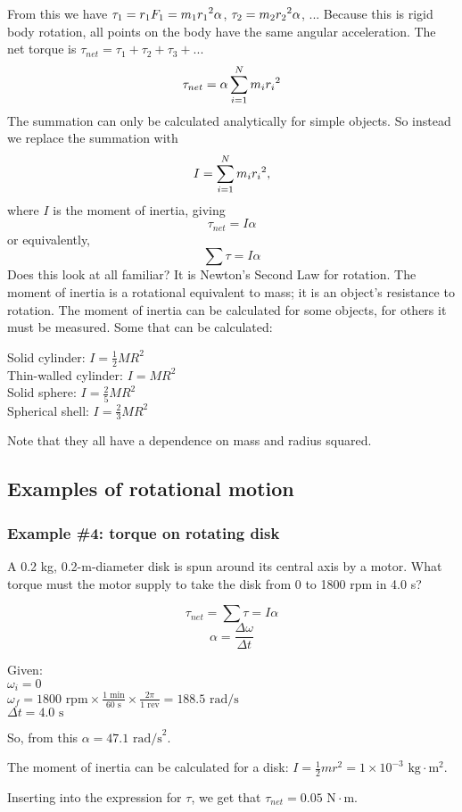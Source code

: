 From this we have $\tau_1=r_1F_1=m_1r_1\displaystyle^2\alpha$, $\tau_2=m_2r_2\displaystyle^2\alpha$, $...$ Because this is rigid body rotation, all points on the body have the same angular acceleration. The net torque is $\tau_{net}=\tau_1+\tau_2+\tau_3+...$
$$\tau_{net}=\alpha\sum_{i=1}^Nm_ir_i\displaystyle^2$$
The summation can only be calculated analytically for simple objects. So instead we replace the summation with
$$I=\sum_{i=1}^Nm_ir_i\displaystyle^2,$$
where $I$ is the moment of inertia, giving
$$\tau_{net}=I\alpha$$
or equivalently,
$$\boxed{\sum\tau=I\alpha}$$
Does this look at all familiar? It is Newton's Second Law for rotation. The moment of inertia is a rotational equivalent to mass; it is an object's resistance to rotation. The moment of inertia can be calculated for some objects, for others it must be measured. Some that can be calculated:

Solid cylinder: $I=\frac{1}{2}MR^2$\\
Thin-walled cylinder: $I=MR^2$\\
Solid sphere: $I=\frac{2}{5}MR^2$\\
Spherical shell: $I=\frac{2}{3}MR^2$

Note that they all have a dependence on mass and radius squared.

\subsection{Examples of rotational motion}
\subsubsection*{Example \#4: torque on rotating disk}
A 0.2 kg, 0.2-m-diameter disk is spun around its central axis by a motor. What torque must the motor supply to take the disk from 0 to 1800 rpm in 4.0 s?

$$\tau_{net}=\sum\tau=I\alpha$$
$$\alpha=\frac{\Delta\omega}{\Delta t}$$

Given:\\
$\omega_i=0$\\
$\omega_f=1800\mbox{ rpm}\times\frac{1\mbox{ min}}{60\mbox{ s}}\times\frac{2\pi}{1\mbox{ rev}}=188.5\mbox{ rad/s}$\\
$\Delta t=4.0\mbox{ s}$

So, from this $\boxed{\alpha=47.1\mbox{ rad/s}^2}$.

The moment of inertia can be calculated for a disk: $I=\frac{1}{2}mr^2=1\times 10^{-3}\mbox{ kg}\cdot\mbox{m}^2$.

Inserting into the expression for $\tau$, we get that $\boxed{\tau_{net}=0.05\mbox{ N}\cdot\mbox{m}}$.

